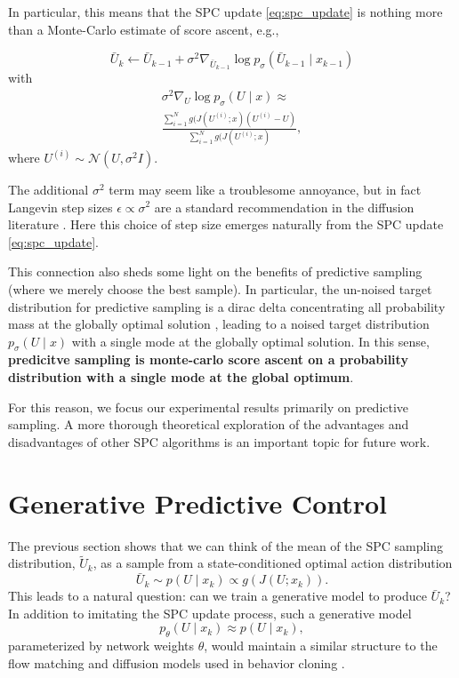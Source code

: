 \documentclass[letterpaper, 10 pt]{ieeeconf}
\begin{document}
In particular, this means that the SPC update \eqref{eq:spc_update} is nothing more than a Monte-Carlo estimate of score ascent, e.g.,

\begin{equation}
    \bar{U}_k \gets \bar{U}_{k-1} + \sigma^2 \nabla_{\bar{U}_{k-1}} \log p_\sigma(\bar{U}_{k-1} \mid x_{k-1})
\end{equation}
with
\begin{multline}
    \sigma^2 \nabla_U \log p_\sigma(U \mid x) \approx \\
    \frac{\sum_{i=1}^{N} g(J(U^{(i)}; x)(U^{(i)} - U)}{\sum_{i=1}^N g(J(U^{(i)}; x)},
\end{multline}
where $U^{(i)} \sim \mathcal{N}(U, \sigma^2I)$.

The additional $\sigma^2$ term may seem like a troublesome annoyance, but in fact Langevin step sizes $\epsilon \propto \sigma^2$ are a standard recommendation in the diffusion literature \cite[Algorithm~1]{song2019generative}. Here this choice of step size emerges naturally from the SPC update \eqref{eq:spc_update}.

This connection also sheds some light on the benefits of predictive sampling (where we merely choose the best sample). In particular, the un-noised target distribution for predictive sampling is a dirac delta concentrating all probability mass at the globally optimal solution \cite[Appendix~A]{pan2024model}, leading to a noised target distribution $p_\sigma(U \mid x)$ with a single mode at the globally optimal solution. In this sense, \textbf{predicitve sampling is monte-carlo score ascent on a probability distribution with a single mode at the global optimum}. 

For this reason, we focus our experimental results primarily on predictive sampling. A more thorough theoretical exploration of the advantages and disadvantages of other SPC algorithms is an important topic for future work. 

\section{Generative Predictive Control}

The previous section shows that we can think of the mean of the SPC sampling distribution, $\tilde{U}_k$, as a sample from a state-conditioned optimal action distribution
\begin{equation}\label{eq:gpc_target}
    \bar{U}_k \sim p(U \mid x_k) \propto g(J(U; x_k)).
\end{equation}
This leads to a natural question: can we train a generative model to produce $\bar{U}_k$? In addition to imitating the SPC update process, such a generative model
\begin{equation}\label{eq:gpc_param_model}
    p_\theta(U \mid x_k) \approx p(U \mid x_k),
\end{equation}
parameterized by network weights $\theta$, would maintain a similar structure to the flow matching and diffusion models used in behavior cloning \cite{chi2023diffusion, fu2024mobile, zhao2023learning, black2024pi_0}.
\end{document}
